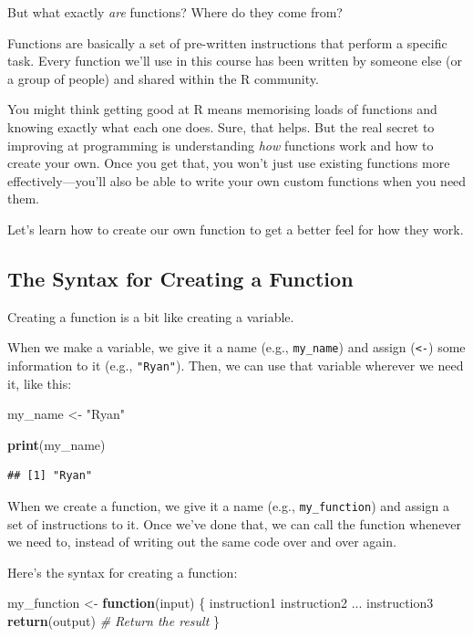 \documentclass[
]{book}
\newenvironment{Shaded}{\begin{snugshade}}{\end{snugshade}}
\newcommand{\CommentTok}[1]{\textcolor[rgb]{0.56,0.35,0.01}{\textit{#1}}}
\newcommand{\ControlFlowTok}[1]{\textcolor[rgb]{0.13,0.29,0.53}{\textbf{#1}}}
\newcommand{\FunctionTok}[1]{\textcolor[rgb]{0.13,0.29,0.53}{\textbf{#1}}}
\newcommand{\NormalTok}[1]{#1}
\newcommand{\OtherTok}[1]{\textcolor[rgb]{0.56,0.35,0.01}{#1}}
\newcommand{\StringTok}[1]{\textcolor[rgb]{0.31,0.60,0.02}{#1}}
\begin{document}
But what exactly \emph{are} functions? Where do they come from?

Functions are basically a set of pre-written instructions that perform a specific task. Every function we'll use in this course has been written by someone else (or a group of people) and shared within the R community.

You might think getting good at R means memorising loads of functions and knowing exactly what each one does. Sure, that helps. But the real secret to improving at programming is understanding \emph{how} functions work and how to create your own. Once you get that, you won't just use existing functions more effectively---you'll also be able to write your own custom functions when you need them.

Let's learn how to create our own function to get a better feel for how they work.

\subsection{\texorpdfstring{\textbf{The Syntax for Creating a Function}}{The Syntax for Creating a Function}}\label{the-syntax-for-creating-a-function}

Creating a function is a bit like creating a variable.

When we make a variable, we give it a name (e.g., \texttt{my\_name}) and assign (\texttt{\textless{}-}) some information to it (e.g., \texttt{"Ryan"}). Then, we can use that variable wherever we need it, like this:

\begin{Shaded}
\begin{Highlighting}[]
\NormalTok{my\_name }\OtherTok{\textless{}{-}} \StringTok{"Ryan"}

\FunctionTok{print}\NormalTok{(my\_name)}
\end{Highlighting}
\end{Shaded}

\begin{verbatim}
## [1] "Ryan"
\end{verbatim}

When we create a function, we give it a name (e.g., \texttt{my\_function}) and assign a set of instructions to it. Once we've done that, we can call the function whenever we need to, instead of writing out the same code over and over again.

Here's the syntax for creating a function:

\begin{Shaded}
\begin{Highlighting}[]
\NormalTok{my\_function }\OtherTok{\textless{}{-}} \ControlFlowTok{function}\NormalTok{(input) \{}
\NormalTok{  instruction1}
\NormalTok{  instruction2}
\NormalTok{  ...}
\NormalTok{  instruction3}
  \FunctionTok{return}\NormalTok{(output) }\CommentTok{\# Return the result}
\NormalTok{\}}
\end{Highlighting}
\end{Shaded}
\end{document}
